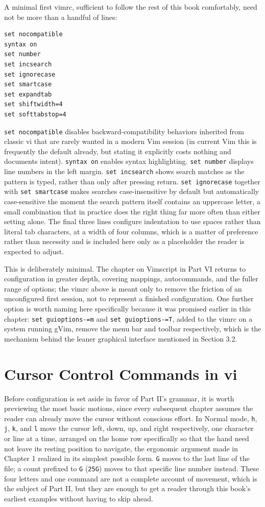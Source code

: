 A minimal first vimrc, sufficient to follow the rest of this book comfortably, need not be more than a handful of lines:

\begin{lstlisting}
set nocompatible
syntax on
set number
set incsearch
set ignorecase
set smartcase
set expandtab
set shiftwidth=4
set softtabstop=4
\end{lstlisting}

\texttt{set nocompatible} disables backward-compatibility behaviors inherited from classic vi that are rarely wanted in a modern Vim session (in current Vim this is frequently the default already, but stating it explicitly costs nothing and documents intent). \texttt{syntax on} enables syntax highlighting. \texttt{set number} displays line numbers in the left margin. \texttt{set incsearch} shows search matches as the pattern is typed, rather than only after pressing return. \texttt{set ignorecase} together with \texttt{set smartcase} makes searches case-insensitive by default but automatically case-sensitive the moment the search pattern itself contains an uppercase letter, a small combination that in practice does the right thing far more often than either setting alone. The final three lines configure indentation to use spaces rather than literal tab characters, at a width of four columns, which is a matter of preference rather than necessity and is included here only as a placeholder the reader is expected to adjust.

This is deliberately minimal. The chapter on Vimscript in Part VI returns to configuration in greater depth, covering mappings, autocommands, and the fuller range of options; the vimrc above is meant only to remove the friction of an unconfigured first session, not to represent a finished configuration. One further option is worth naming here specifically because it was promised earlier in this chapter: \texttt{set guioptions-=m} and \texttt{set guioptions-=T}, added to the vimrc on a system running gVim, remove the menu bar and toolbar respectively, which is the mechanism behind the leaner graphical interface mentioned in Section 3.2.

\section{Cursor Control Commands in vi}

Before configuration is set aside in favor of Part II's grammar, it is worth previewing the most basic motions, since every subsequent chapter assumes the reader can already move the cursor without conscious effort. In Normal mode, \texttt{h}, \texttt{j}, \texttt{k}, and \texttt{l} move the cursor left, down, up, and right respectively, one character or line at a time, arranged on the home row specifically so that the hand need not leave its resting position to navigate, the ergonomic argument made in Chapter 1 realized in its simplest possible form. \texttt{G} moves to the last line of the file; a count prefixed to \texttt{G} (\texttt{25G}) moves to that specific line number instead. These four letters and one command are not a complete account of movement, which is the subject of Part II, but they are enough to get a reader through this book's earliest examples without having to skip ahead.

